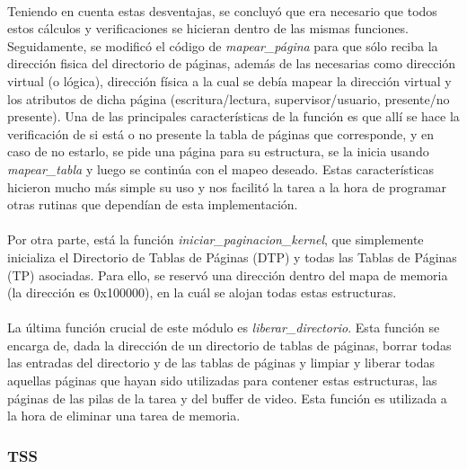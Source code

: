 \documentclass[11pt, a4paper]{article}
\begin{document}
\paragraph{}
Teniendo en cuenta estas desventajas, se concluyó que era necesario que todos estos cálculos y verificaciones se hicieran dentro de las mismas funciones. Seguidamente, se modificó el código de \textit{mapear\_página} para que sólo reciba la dirección fisica del directorio de páginas, además de las necesarias como dirección virtual (o lógica), dirección física a la cual se debía mapear la dirección virtual y los atributos de dicha página (escritura/lectura, supervisor/usuario, presente/no presente). Una de las principales características de la función es que allí se hace la verificación de si está o no presente la tabla de páginas que corresponde, y en caso de no estarlo, se pide una página para su estructura, se la inicia usando \textit{mapear\_tabla} y luego se continúa con el mapeo deseado. Estas características hicieron mucho más simple su uso y nos facilitó la tarea a la hora de programar otras rutinas que dependían de esta implementación.

\paragraph{}
Por otra parte, está la función \textit{iniciar\_paginacion\_kernel}, que simplemente inicializa el Directorio de Tablas de Páginas (DTP) y todas las Tablas de Páginas (TP) asociadas. Para ello, se reservó una dirección dentro del mapa de memoria (la dirección es 0x100000), en la cuál se alojan todas estas estructuras.

\paragraph{}
La última función crucial de este módulo es \textit{liberar\_directorio}. Esta función se encarga de, dada la dirección de un directorio de tablas de páginas, borrar todas las entradas del directorio y de las tablas de páginas y limpiar y liberar todas aquellas páginas que hayan sido utilizadas para contener estas estructuras, las páginas de las pilas de la tarea y del buffer de video. Esta función es utilizada a la hora de eliminar una tarea de memoria.

\subsubsection{TSS}
\end{document}
